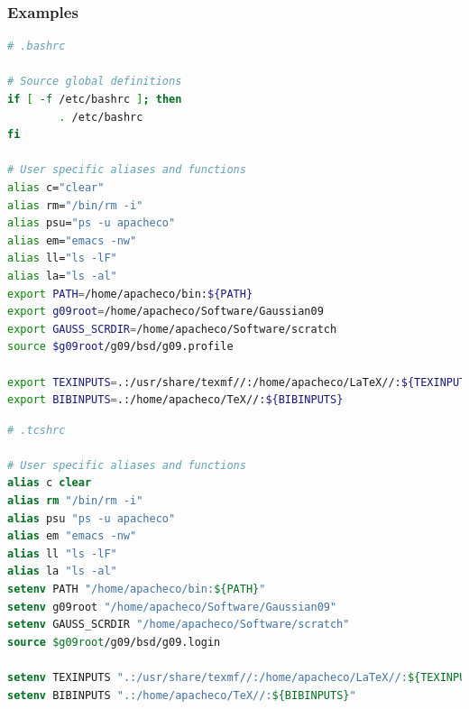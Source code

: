 \documentclass[c,compress,xcolor=svgnames]{beamer}
\begin{document}
\begin{frame}
  \frametitle{\small Examples}
  \begin{lstlisting}[language=bash]
# .bashrc

# Source global definitions
if [ -f /etc/bashrc ]; then
        . /etc/bashrc
fi

# User specific aliases and functions
alias c="clear"
alias rm="/bin/rm -i"
alias psu="ps -u apacheco"
alias em="emacs -nw"
alias ll="ls -lF"
alias la="ls -al"
export PATH=/home/apacheco/bin:${PATH}
export g09root=/home/apacheco/Software/Gaussian09
export GAUSS_SCRDIR=/home/apacheco/Software/scratch
source $g09root/g09/bsd/g09.profile

export TEXINPUTS=.:/usr/share/texmf//:/home/apacheco/LaTeX//:${TEXINPUTS}
export BIBINPUTS=.:/home/apacheco/TeX//:${BIBINPUTS}
  \end{lstlisting}

  \begin{lstlisting}[language=csh]
# .tcshrc

# User specific aliases and functions
alias c clear
alias rm "/bin/rm -i"
alias psu "ps -u apacheco"
alias em "emacs -nw"
alias ll "ls -lF"
alias la "ls -al"
setenv PATH "/home/apacheco/bin:${PATH}"
setenv g09root "/home/apacheco/Software/Gaussian09"
setenv GAUSS_SCRDIR "/home/apacheco/Software/scratch"
source $g09root/g09/bsd/g09.login

setenv TEXINPUTS ".:/usr/share/texmf//:/home/apacheco/LaTeX//:${TEXINPUTS}"
setenv BIBINPUTS ".:/home/apacheco/TeX//:${BIBINPUTS}"
  \end{lstlisting}
\end{frame}
\end{document}
